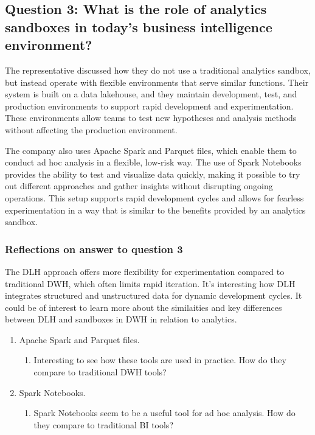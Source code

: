 \subsection{Question 3: What is the role of analytics sandboxes in today's business intelligence environment?} 

The representative discussed how they do not use a traditional analytics sandbox, but instead operate with flexible environments that 
serve similar functions. Their system is built on a data lakehouse, and they maintain development, test, and production environments 
to support rapid development and experimentation. These environments allow teams to test new hypotheses and analysis methods without 
affecting the production environment.

The company also uses Apache Spark and Parquet files, which enable them to conduct ad hoc analysis in a flexible, low-risk way. The 
use of Spark Notebooks provides the ability to test and visualize data quickly, making it possible to try out different approaches and 
gather insights without disrupting ongoing operations. This setup supports rapid development cycles and allows for fearless experimentation 
in a way that is similar to the benefits provided by an analytics sandbox.
\subsubsection{Reflections on answer to question 3}

The DLH approach offers more flexibility for experimentation compared to traditional DWH, which often limits rapid iteration. 
It's interesting how DLH integrates structured and unstructured data for dynamic development cycles. It could be of interest
to learn more about the similaities and key differences between DLH and sandboxes in DWH in relation to analytics.

\begin{enumerate}
    \item Apache Spark and Parquet files.
    \begin{enumerate}
        \item Interesting to see how these tools are used in practice. How do they compare to traditional DWH tools?
    \end{enumerate}
    \item Spark Notebooks.
    \begin{enumerate}
        \item Spark Notebooks seem to be a useful tool for ad hoc analysis. How do they compare to traditional BI tools?
    \end{enumerate}
\end{enumerate}
